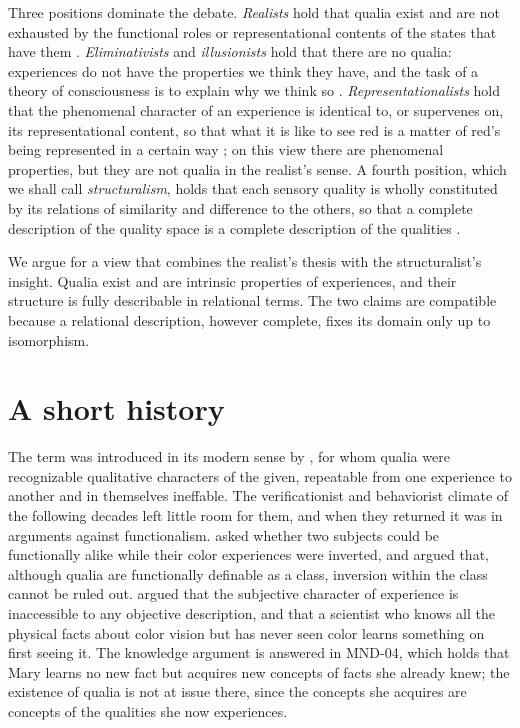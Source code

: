 \documentclass{situationist-preprint}
\begin{document}
Three positions dominate the debate. \emph{Realists} hold that qualia exist and are not exhausted by the functional roles or representational contents of the states that have them \citep{Block1990,Block1996,Chalmers1996}. \emph{Eliminativists} and \emph{illusionists} hold that there are no qualia: experiences do not have the properties we think they have, and the task of a theory of consciousness is to explain why we think so \citep{Dennett1988,Frankish2016}. \emph{Representationalists} hold that the phenomenal character of an experience is identical to, or supervenes on, its representational content, so that what it is like to see red is a matter of red's being represented in a certain way \citep{Harman1990,Tye1995}; on this view there are phenomenal properties, but they are not qualia in the realist's sense. A fourth position, which we shall call \emph{structuralism}, holds that each sensory quality is wholly constituted by its relations of similarity and difference to the others, so that a complete description of the quality space is a complete description of the qualities \citep{Clark1993,Lee2021}.

We argue for a view that combines the realist's thesis with the structuralist's insight. Qualia exist and are intrinsic properties of experiences, and their structure is fully describable in relational terms. The two claims are compatible because a relational description, however complete, fixes its domain only up to isomorphism.

\section{A short history}

The term was introduced in its modern sense by \citet{Lewis1929}, for whom qualia were recognizable qualitative characters of the given, repeatable from one experience to another and in themselves ineffable. The verificationist and behaviorist climate of the following decades left little room for them, and when they returned it was in arguments against functionalism. \citet{Shoemaker1982} asked whether two subjects could be functionally alike while their color experiences were inverted, and argued that, although qualia are functionally definable as a class, inversion within the class cannot be ruled out. \citet{Nagel1974} argued that the subjective character of experience is inaccessible to any objective description, and \citet{Jackson1982} that a scientist who knows all the physical facts about color vision but has never seen color learns something on first seeing it. The knowledge argument is answered in MND-04, which holds that Mary learns no new fact but acquires new concepts of facts she already knew; the existence of qualia is not at issue there, since the concepts she acquires are concepts of the qualities she now experiences.
\end{document}
